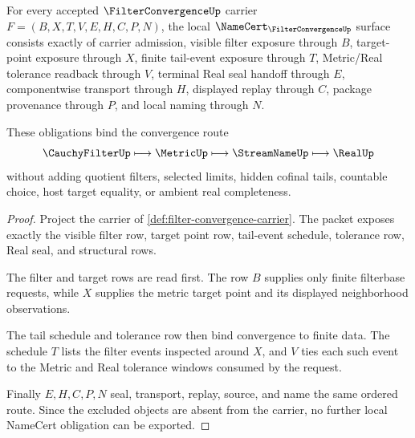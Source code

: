 \begin{theorem}
\label{thm:filter-convergence-namecert-obligations}
For every accepted $\FilterConvergenceUp$ carrier $F=(B,X,T,V,E,H,C,P,N)$, the local $\NameCert_{\FilterConvergenceUp}$ surface consists exactly of carrier admission, visible filter exposure through $B$, target-point exposure through $X$, finite tail-event exposure through $T$, Metric/Real tolerance readback through $V$, terminal Real seal handoff through $E$, componentwise transport through $H$, displayed replay through $C$, package provenance through $P$, and local naming through $N$.

These obligations bind the convergence route
$$
\CauchyFilterUp \longmapsto \MetricUp \longmapsto \StreamNameUp \longmapsto \RealUp
$$
without adding quotient filters, selected limits, hidden cofinal tails, countable choice, host target equality, or ambient real completeness.
\end{theorem}
\begin{proof}
Project the carrier of \autoref{def:filter-convergence-carrier}. The packet exposes exactly the visible filter row, target point row, tail-event schedule, tolerance row, Real seal, and structural rows.

The filter and target rows are read first. The row $B$ supplies only finite filterbase requests, while $X$ supplies the metric target point and its displayed neighborhood observations.

The tail schedule and tolerance row then bind convergence to finite data. The schedule $T$ lists the filter events inspected around $X$, and $V$ ties each such event to the Metric and Real tolerance windows consumed by the request.

Finally $E,H,C,P,N$ seal, transport, replay, source, and name the same ordered route. Since the excluded objects are absent from the carrier, no further local NameCert obligation can be exported.
\end{proof}

